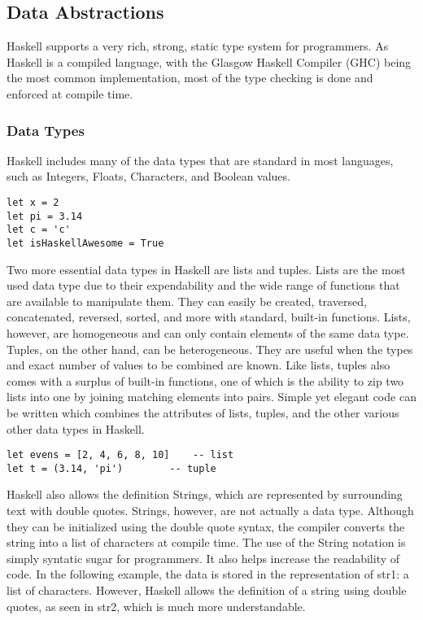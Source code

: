 \documentclass[titlepage,12pt]{article}
\begin{document}
\subsection{Data Abstractions}
Haskell supports a very rich, strong, static type system for programmers.  As Haskell is
a compiled language, with the Glasgow Haskell Compiler (GHC) being the most common implementation,
most of the type checking is done and enforced at compile time.

\subsubsection{Data Types}

Haskell includes many of the data types that are standard in most languages, such as Integers, Floats, Characters, and Boolean values. 

\begin{verbatim}
let x = 2
let pi = 3.14
let c = 'c'
let isHaskellAwesome = True
\end{verbatim}

Two more essential data types in Haskell are lists and tuples. Lists are the most used data type due to their expendability 
and the wide range of functions that are available to manipulate them. They can easily be created, traversed, concatenated, 
reversed, sorted, and more with standard, built-in functions. Lists, however, are homogeneous and can only contain elements 
of the same data type. Tuples, on the other hand, can be heterogeneous. They are useful when the types and exact number of 
values to be combined are known. Like lists, tuples also comes with a surplus of built-in functions, one of which is the 
ability to zip two lists into one by joining matching elements into pairs. Simple yet elegant code can be written which 
combines the attributes of lists, tuples, and the other various other data types in Haskell.

\begin{verbatim}
let evens = [2, 4, 6, 8, 10]	-- list
let t = (3.14, 'pi')		-- tuple
\end{verbatim}

Haskell also allows the definition Strings, which are represented by surrounding text with double quotes. Strings, however, 
are not actually a data type. Although they can be initialized using the double quote syntax, the compiler converts the 
string into a list of characters at compile time. The use of the String notation is simply syntatic sugar for programmers. 
It also helps increase the readability of code. In the following example, the data is stored in the representation of 
str1: a list of characters. However, Haskell allows the definition of a string using double quotes, as seen in str2, 
which is much more understandable.
\end{document}
